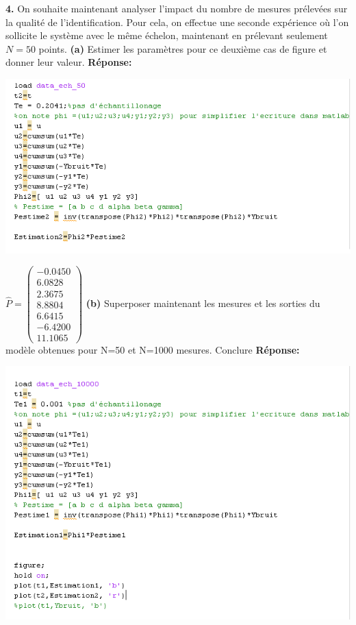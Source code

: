 \documentclass[12pt]{article}
\begin{document}
\medbreak
\textbf{4.} On souhaite maintenant analyser l'impact du nombre de mesures prélevées sur la qualité de l'identification. Pour cela, on effectue une seconde expérience où l'on sollicite le système avec le même échelon, maintenant en prélevant seulement $N=50$ points.
\smallbreak
\textbf{(a)} Estimer les paramètres pour ce deuxième cas de figure et donner leur valeur.
\smallbreak
\textbf{Réponse:}
\begin{flushleft}
\includegraphics{2_4_a.PNG}
\end{flushleft}
$\hat{P}=
\begin{pmatrix}
  -0.0450\\
    6.0828\\
    2.3675\\
    8.8804\\
    6.6415\\
   -6.4200\\
   11.1065
\end{pmatrix}
$
\smallbreak
\textbf{(b)} Superposer maintenant les mesures et les sorties du modèle obtenues pour N=50 et N=1000 mesures. Conclure
\textbf{Réponse:}
\begin{flushleft}
\includegraphics{2_4_a_2.PNG}
\end{flushleft}
\end{document}
